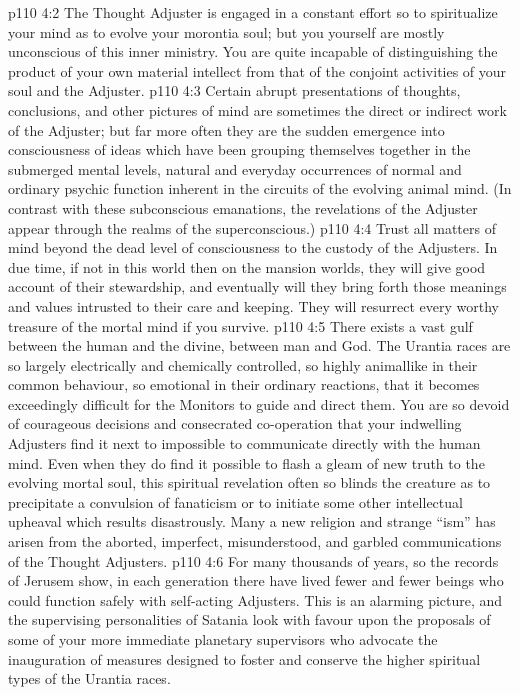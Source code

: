 \vs p110 4:2 The Thought Adjuster is engaged in a constant effort so to spiritualize your mind as to evolve your morontia soul; but you yourself are mostly unconscious of this inner ministry. You are quite incapable of distinguishing the product of your own material intellect from that of the conjoint activities of your soul and the Adjuster.
\vs p110 4:3 Certain abrupt presentations of thoughts, conclusions, and other pictures of mind are sometimes the direct or indirect work of the Adjuster; but far more often they are the sudden emergence into consciousness of ideas which have been grouping themselves together in the submerged mental levels, natural and everyday occurrences of normal and ordinary psychic function inherent in the circuits of the evolving animal mind. (In contrast with these subconscious emanations, the revelations of the Adjuster appear through the realms of the superconscious.)
\vs p110 4:4 Trust all matters of mind beyond the dead level of consciousness to the custody of the Adjusters. In due time, if not in this world then on the mansion worlds, they will give good account of their stewardship, and eventually will they bring forth those meanings and values intrusted to their care and keeping. They will resurrect every worthy treasure of the mortal mind if you survive.
\vs p110 4:5 \pc There exists a vast gulf between the human and the divine, between man and God. The Urantia races are so largely electrically and chemically controlled, so highly animallike in their common behaviour, so emotional in their ordinary reactions, that it becomes exceedingly difficult for the Monitors to guide and direct them. You are so devoid of courageous decisions and consecrated co\hyp{}operation that your indwelling Adjusters find it next to impossible to communicate directly with the human mind. Even when they do find it possible to flash a gleam of new truth to the evolving mortal soul, this spiritual revelation often so blinds the creature as to precipitate a convulsion of fanaticism or to initiate some other intellectual upheaval which results disastrously. Many a new religion and strange “ism” has arisen from the aborted, imperfect, misunderstood, and garbled communications of the Thought Adjusters.
\vs p110 4:6 For many thousands of years, so the records of Jerusem show, in each generation there have lived fewer and fewer beings who could function safely with self\hyp{}acting Adjusters. This is an alarming picture, and the supervising personalities of Satania look with favour upon the proposals of some of your more immediate planetary supervisors who advocate the inauguration of measures designed to foster and conserve the higher spiritual types of the Urantia races.
